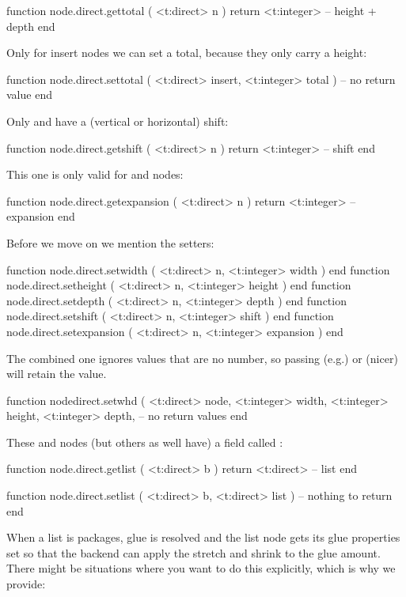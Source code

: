 \starttyping[option=LUA]
function node.direct.gettotal ( <t:direct> n )
    return <t:integer> -- height + depth
end
\stoptyping

Only for insert nodes we can set a total, because they only carry a height:

\starttyping[option=LUA]
function node.direct.settotal (
    <t:direct>  insert,
    <t:integer> total
)
    -- no return value
end
\stoptyping

Only  and  have a (vertical or horizontal) shift:

\starttyping[option=LUA]
function node.direct.getshift ( <t:direct> n )
    return <t:integer> -- shift
end
\stoptyping

This one is only valid for  and  nodes:

\starttyping[option=LUA]
function node.direct.getexpansion ( <t:direct> n )
    return <t:integer> -- expansion
end
\stoptyping

Before we move on we mention the setters:

\starttyping[option=LUA]
function node.direct.setwidth     ( <t:direct> n, <t:integer> width     ) end
function node.direct.setheight    ( <t:direct> n, <t:integer> height    ) end
function node.direct.setdepth     ( <t:direct> n, <t:integer> depth     ) end
function node.direct.setshift     ( <t:direct> n, <t:integer> shift     ) end
function node.direct.setexpansion ( <t:direct> n, <t:integer> expansion ) end
\stoptyping

The combined one ignores values that are no number, so passing (e.g.) 
or (nicer)  will retain the value.

\starttyping[option=LUA]
function nodedirect.setwhd (
    <t:direct>  node,
    <t:integer> width,
    <t:integer> height,
    <t:integer> depth,
    -- no return values
end
\stoptyping

These  and  nodes (but others as well have) a field
called :

\starttyping[option=LUA]
function node.direct.getlist ( <t:direct> b )
    return <t:direct> -- list
end

function node.direct.setlist ( <t:direct> b, <t:direct> list )
    -- nothing to return
end
\stoptyping

When a list is packages, glue is resolved and the list node gets its glue properties
set so that the backend can apply the stretch and shrink to the glue amount. There might
be situations where you want to do this explicitly, which is why we provide:

